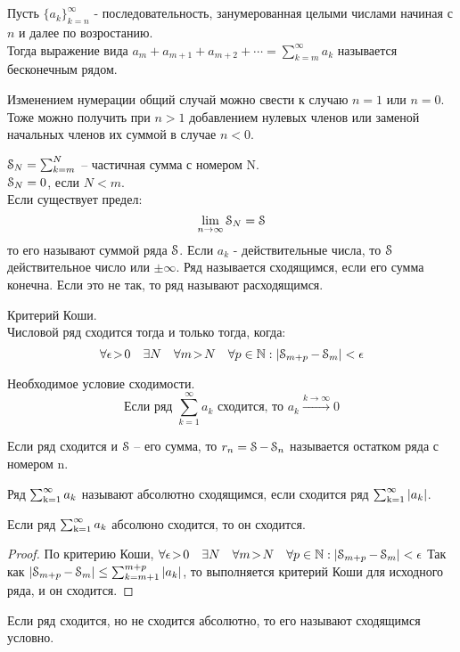 \chapter{}
\begin{deff}
Пусть $ \{a_k \}_{k=n}^{\infty} $ - последовательность, занумерованная целыми числами начиная с $ n $ и далее по возростанию.\\
Тогда выражение вида $a_m+a_{m+1}+a_{m+2}+ \cdots = \sum_{k=m}^{\infty} a_k$ называется бесконечным рядом.\\
\end{deff}
Изменением нумерации общий случай можно свести к случаю $n=1$ или $n=0$.
Тоже можно получить при $n>1$ добавлением нулевых членов или заменой начальных членов их суммой в случае $n<0$.
\begin{deff}
$ \operatorname{\EuScript{S}}_{N} = \sum_{k=m}^{N} $ -- частичная сумма с номером N.\\
$ \operatorname{\EuScript{S}}_{N} = 0 $, если $ N < m $.\\
Если существует предел:
$$ \lim_{n \to \infty} {\operatorname{\EuScript{S}}_N} = \operatorname{\EuScript{S}} $$
то его называют суммой ряда $\operatorname{\EuScript{S}}$. Если $a_k$ - действительные числа, то $\operatorname{\EuScript{S}}$ действительное число или $\pm \infty$.
Ряд называется сходящимся, если его сумма конечна. 
Если это не так, то ряд называют расходящимся.
\end{deff}
\begin{st}Критерий Коши.\\
Числовой ряд сходится тогда и только тогда, когда:
$$ \forall{\epsilon\!>\! 0} \quad \exists N \quad \forall m \! >\! N \quad \forall p \in \operatorname{\mathbb{N}} : \left| \operatorname{\EuScript{S}}_{m+p} - \operatorname{\EuScript{S}}_m \right| < \epsilon$$ 
\end{st}
\begin{st}Необходимое условие сходимости.\\
$$ \mbox{Если ряд } \sum_{k=1}^{\infty} a_k \mbox{ сходится, то } a_k \xrightarrow{k\to\infty}0$$
\end{st}
\begin{deff}
Если ряд сходится и $\operatorname{\EuScript{S}}$ -- его сумма, то $r_n = \operatorname{\EuScript{S}} - \operatorname{\EuScript{S}}_n$ называется остатком ряда с номером n.
\end{deff}
\begin{deff}
Ряд $\operatorname{\sum_{k=1}^{\infty}} a_k $ называют абсолютно сходящимся, если сходится ряд $\operatorname{\sum_{k=1}^{\infty}} |a_k| $.
\end{deff}
\begin{thm}
Если ряд $\operatorname{\sum_{k=1}^{\infty}} a_k$ абсолюно сходится, то он сходится.
\end{thm}
\begin{proof}
По критерию Коши, $ \forall{\epsilon\!>\! 0} \quad \exists N \quad \forall m \! >\! N \quad \forall p \in \operatorname{\mathbb{N}} : \left| \operatorname{\EuScript{S}}_{m+p} - \operatorname{\EuScript{S}}_m \right| < \epsilon$
Так как $\left| \operatorname{\EuScript{S}}_{m+p} - \operatorname{\EuScript{S}}_m \right| \le \sum_{k=m+1}^{m+p}|a_k|$, то выполняется критерий Коши для исходного ряда, и он сходится.
\end{proof}
\begin{deff}
Если ряд сходится, но не сходится абсолютно, то его называют сходящимся условно.
\end{deff}
